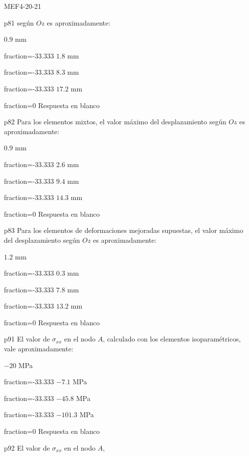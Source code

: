 \documentclass[a4paper]{article}
\begin{document}
\begin{quiz}{MEF4-20-21}
\begin{multi}{p81}
	seg\'un $Oz$ es aproximadamente:
	\item* $0.9$ mm
	\item[fraction=-33.333] $1.8$ mm
	\item[fraction=-33.333] $8.3$ mm
	\item[fraction=-33.333] $17.2$ mm
	\item[fraction=0] Respuesta en blanco
\end{multi}
\begin{multi}{p82}
	Para los elementos mixtos, el valor m\'aximo del desplazamiento
	seg\'un $Oz$ es aproximadamente:
	\item* $0.9$ mm
	\item[fraction=-33.333] $2.6$ mm
	\item[fraction=-33.333] $9.4$ mm
	\item[fraction=-33.333] $14.3$ mm
	\item[fraction=0] Respuesta en blanco
\end{multi}
\begin{multi}{p83}
	Para los elementos de deformaciones mejoradas supuestas, el valor m\'aximo
	del desplazamiento seg\'un $Oz$ es aproximadamente:
	\item* $1.2$ mm
	\item[fraction=-33.333] $0.3$ mm
	\item[fraction=-33.333] $7.8$ mm
	\item[fraction=-33.333] $13.2$ mm
	\item[fraction=0] Respuesta en blanco
\end{multi}
\begin{multi}{p91}
	El valor de $\sigma_{xx}$ en el nodo $A$,
	calculado con los elementos isoparam\'etricos, vale aproximadamente:
	\item* $-20$ MPa
	\item[fraction=-33.333] $-7.1$ MPa
	\item[fraction=-33.333] $-45.8$ MPa
	\item[fraction=-33.333] $-101.3$ MPa
	\item[fraction=0] Respuesta en blanco
	\end{multi}
\begin{multi}{p92}
	El valor de $\sigma_{xx}$ en el nodo $A$,

\end{multi}
\end{quiz}
\end{document}

